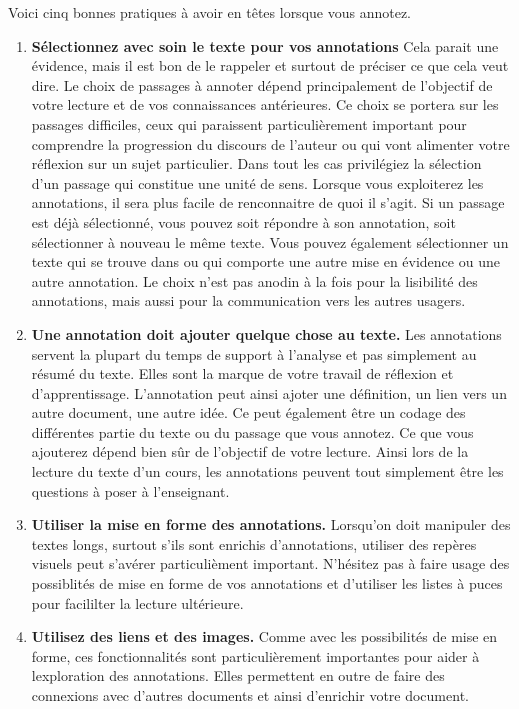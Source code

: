 \documentclass[
]{book}
\begin{document}
Voici cinq bonnes pratiques à avoir en têtes lorsque vous annotez.

\begin{enumerate}
\def\labelenumi{\arabic{enumi}.}
\item
  \textbf{Sélectionnez avec soin le texte pour vos annotations} Cela parait une évidence, mais il est bon de le rappeler et surtout de préciser ce que cela veut dire. Le choix de passages à annoter dépend principalement de l'objectif de votre lecture et de vos connaissances antérieures. Ce choix se portera sur les passages difficiles, ceux qui paraissent particulièrement important pour comprendre la progression du discours de l'auteur ou qui vont alimenter votre réflexion sur un sujet particulier. Dans tout les cas privilégiez la sélection d'un passage qui constitue une unité de sens. Lorsque vous exploiterez les annotations, il sera plus facile de renconnaitre de quoi il s'agit. Si un passage est déjà sélectionné, vous pouvez soit répondre à son annotation, soit sélectionner à nouveau le même texte. Vous pouvez également sélectionner un texte qui se trouve dans ou qui comporte une autre mise en évidence ou une autre annotation. Le choix n'est pas anodin à la fois pour la lisibilité des annotations, mais aussi pour la communication vers les autres usagers.
\item
  \textbf{Une annotation doit ajouter quelque chose au texte.} Les annotations servent la plupart du temps de support à l'analyse et pas simplement au résumé du texte. Elles sont la marque de votre travail de réflexion et d'apprentissage. L'annotation peut ainsi ajoter une définition, un lien vers un autre document, une autre idée. Ce peut également être un codage des différentes partie du texte ou du passage que vous annotez. Ce que vous ajouterez dépend bien sûr de l'objectif de votre lecture. Ainsi lors de la lecture du texte d'un cours, les annotations peuvent tout simplement être les questions à poser à l'enseignant.
\item
  \textbf{Utiliser la mise en forme des annotations.} Lorsqu'on doit manipuler des textes longs, surtout s'ils sont enrichis d'annotations, utiliser des repères visuels peut s'avérer particulièment important. N'hésitez pas à faire usage des possiblités de mise en forme de vos annotations et d'utiliser les listes à puces pour facililter la lecture ultérieure.
\item
  \textbf{Utilisez des liens et des images.} Comme avec les possibilités de mise en forme, ces fonctionnalités sont particulièrement importantes pour aider à lexploration des annotations. Elles permettent en outre de faire des connexions avec d'autres documents et ainsi d'enrichir votre document.

\end{enumerate}
\end{document}
